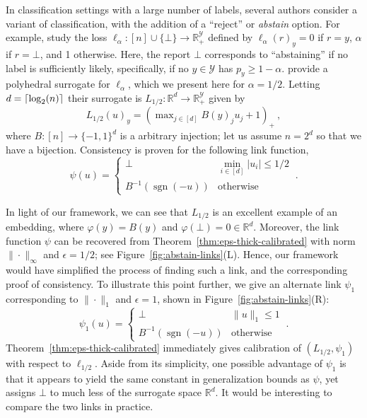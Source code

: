 \documentclass[12pt]{article}
\newcommand{\reals}{\mathbb{R}}
\newcommand{\Y}{\mathcal{Y}}
\DeclarePairedDelimiter\ceil{\lceil}{\rceil}
\newcommand{\ellabs}[1]{\ell_{#1}}
\DeclareMathOperator*{\sgn}{sgn}
\begin{document}
In classification settings with a large number of labels, several authors consider a variant of classification, with the addition of a ``reject'' or \emph{abstain} option.
For example, \citet{ramaswamy2018consistent} study the loss $\ellabs{\alpha} : [n] \cup \{\bot\} \to \reals^\Y_+$ defined by $\ellabs{\alpha}(r)_y = 0$ if $r=y$, $\alpha$ if $r = \bot$, and 1 otherwise.
Here, the report $\bot$ corresponds to ``abstaining'' if no label is sufficiently likely, specifically, if no $y\in\Y$ has $p_y \geq 1-\alpha$.
\citet{ramaswamy2018consistent} provide a polyhedral surrogate for $\ellabs{\alpha}$, which we present here for $\alpha=1/2$.
Letting $d = \ceil{\log_2(n)}$ their surrogate is $L_{1/2} : \reals^d \to \reals^\Y_+$ given by
\begin{equation}\label{eq:abstain-surrogate}
L_{1/2}(u)_y = \left(\max\nolimits_{j \in [d]}B(y)_j u_j + 1\right)_+~,
\end{equation}
where $B:[n]\to\{-1,1\}^d$ is a arbitrary injection; let us assume $n = 2^d$ so that we have a bijection.
Consistency is proven for the following link function,
\begin{equation}\label{eq:abstain-link}
  \psi(u) = \begin{cases}
	\bot & \min_{i \in [d]} |u_i| \leq 1/2\\
	B^{-1}(\sgn(-u)) &\text{otherwise}
  \end{cases}~.
\end{equation}

In light of our framework, we can see that $L_{1/2}$ is an excellent example of an embedding, where $\varphi(y) = B(y)$ and $\varphi(\bot) = 0 \in \reals^d$.
Moreover, the link function $\psi$ can be recovered from Theorem~\ref{thm:eps-thick-calibrated} with norm $\|\cdot\|_\infty$ and $\epsilon=1/2$; see Figure~\ref{fig:abstain-links}(L).
Hence, our framework would have simplified the process of finding such a link, and the corresponding proof of consistency.
To illustrate this point further, we give an alternate link $\psi_1$ corresponding to $\|\cdot\|_1$ and $\epsilon=1$, shown in Figure~\ref{fig:abstain-links}(R):
\begin{equation}\label{eq:abstain-link-1}
  \psi_1(u) = \begin{cases}
	\bot & \|u\|_1 \leq 1\\
	B^{-1}(\sgn(-u)) &\text{otherwise}
  \end{cases}~.
\end{equation}
Theorem~\ref{thm:eps-thick-calibrated} immediately gives calibration of $(L_{1/2},\psi_1)$ with respect to $\ellabs{1/2}$.
Aside from its simplicity, one possible advantage of $\psi_1$ is that it appears to yield the same constant in generalization bounds as $\psi$, yet assigns $\bot$ to much less of the surrogate space $\reals^d$.
It would be interesting to compare the two links in practice.
\end{document}
